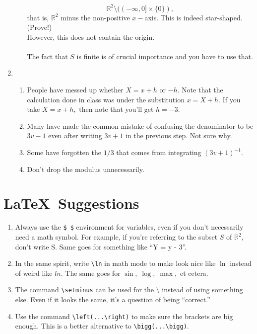 \documentclass{article}
\begin{document}
\begin{enumerate}[label = Q.\arabic*.]
\begin{enumerate}
		\[\mathbb{R}^2 \setminus ((-\infty, 0]\times\{0\}),\]
		that is, $\mathbb{R}^2$ minus the non-positive $x-$axis. This is indeed star-shaped. (Prove!)\\
		However, this does not contain the origin.\\\\
		The fact that $S$ is finite is of crucial importance and you have to use that.
	\end{enumerate}
	\item 
	\begin{enumerate} 
		\item People have messed up whether $X = x + h$ or $-h.$ Note that the calculation done in class was under the substitution $x = X + h.$ If you take $X = x + h,$ then note that you'll get $h = -3.$
		\item Many have made the common mistake of confusing the denominator to be $3v - 1$ even after writing $3v + 1$ in the previous step. Not sure why.
		\item Some have forgotten the $1/3$ that comes from integrating $(3v + 1)^{-1}.$
		\item Don't drop the modulus unnecessarily.
	\end{enumerate}
\end{enumerate}

\section{\LaTeX\ Suggestions}
\begin{enumerate} 
	\item Always use the \verb+$ $+ environment for variables, even if you don't necessarily need a math symbol. For example, if you're referring to the subset $S$ of $\mathbb{R}^2,$ don't write S. Same goes for something like ``Y = y - 3''.
	\item In the same spirit, write \verb+\ln+ in math mode to make look nice like $\ln$ instead of weird like $ln.$ The same goes for $\sin,\;\log,\;\max,$ et cetera.
	\item The command \verb+\setminus+ can be used for the $\setminus$ instead of using something else. Even if it looks the same, it's a question of being ``correct.''
	\item Use the command \verb+\left(...\right)+ to make sure the brackets are big enough. This is a better alternative to \verb+\bigg(...\bigg)+.
\end{enumerate}
\end{document}
